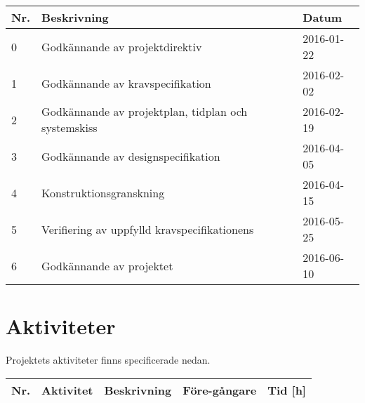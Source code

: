 \documentclass[11pt]{article}
\begin{document}
\begin{flushleft}
\begin{longtable}{| p{.05\linewidth} | p{.7\linewidth} | p{.15\linewidth} |} \hline
\textbf{Nr.} & \textbf{Beskrivning} & \textbf{Datum} \\ \hline
0 & Godkännande av projektdirektiv & 2016-01-22 \\ \hline
1 & Godkännande av kravspecifikation & 2016-02-02 \\ \hline
2 & Godkännande av projektplan, tidplan och systemskiss & 2016-02-19 \\ \hline
3 & Godkännande av designspecifikation & 2016-04-05 \\ \hline
4 & Konstruktionsgranskning & 2016-04-15 \\ \hline
5 & Verifiering av uppfylld kravspecifikationens & 2016-05-25 \\ \hline
6 & Godkännande av projektet & 2016-06-10 \\ \hline

\end{longtable}

\pagebreak
\section{Aktiviteter}
Projektets aktiviteter finns specificerade nedan. 
\begin{longtable}{| p{.05\linewidth} | p{.25\linewidth} | p{.4\linewidth} | p{.1\linewidth} | p{.05\linewidth} |} \hline

\textbf{Nr.} & \textbf{Aktivitet} & \textbf{Beskrivning} & \textbf{Före-gångare} & \textbf{Tid [h]} \\ \hline \endhead


\end{longtable}
\end{flushleft}
\end{document}

